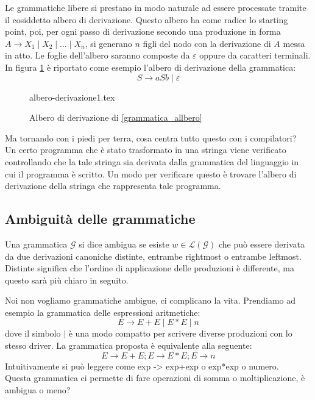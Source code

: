 \documentclass[class=book, crop=false, oneside, 12pt]{standalone}
\begin{document}
Le grammatiche libere si prestano in modo naturale ad essere processate tramite il cosiddetto albero di derivazione.
Questo albero ha come radice lo starting point, poi, per ogni passo di derivazione secondo una produzione in forma \(A \to X_1 \mid X_2 \mid\dots\mid X_n \), si generano \(n\) figli del nodo con la derivazione di \(A\) messa in atto.
Le foglie dell’albero saranno composte da \(\varepsilon\) oppure da caratteri terminali. In figura \ref{albero_di_derivazione} è riportato come esempio l'albero di derivazione della grammatica:
\begin{equation}
    S \to aSb \mid \varepsilon
    \label{grammatica_allbero}
\end{equation}

\begin{figure}[H]
	\centering
    {albero-derivazione1.tex}
    \caption{Albero di derivazione di \ref{grammatica_allbero}}
    \label{albero_di_derivazione}
\end{figure}
Ma tornando con i piedi per terra, cosa centra tutto questo con i compilatori?\\
Un certo programma che è stato trasformato in una stringa viene verificato controllando che la tale stringa sia derivata dalla grammatica del linguaggio in cui il programma è scritto. Un modo per verificare questo è trovare l’albero di derivazione della stringa che rappresenta tale programma.

\subsection{Ambiguità delle grammatiche}\label{sec:ambiguity}
Una grammatica \(\mathcal{G}\) si dice ambigua se esiste \(w \in \mathcal{L}(\mathcal{G})\) che può essere derivata da due derivazioni canoniche distinte, entrambe rightmost o entrambe leftmost. Distinte significa che l'ordine di applicazione delle produzioni è differente, ma questo sarà più chiaro in seguito.

Noi non vogliamo grammatiche ambigue, ci complicano la vita.
Prendiamo ad esempio la grammatica delle espressioni aritmetiche:
\begin{equation}
    E \to E+E \mid E*E \mid  n
\end{equation}
dove il simbolo \(|\) è una modo compatto per scrivere diverse produzioni con lo stesso driver. La grammatica proposta è equivalente alla seguente: 
\begin{equation}
	E \to E+E; E \to E*E; E \to n
\end{equation}
Intuitivamente si può leggere come exp -> exp+exp  o  exp*exp  o  numero.\\
Questa grammatica ci permette di fare operazioni di somma o moltiplicazione, è ambigua o meno?
\end{document}
